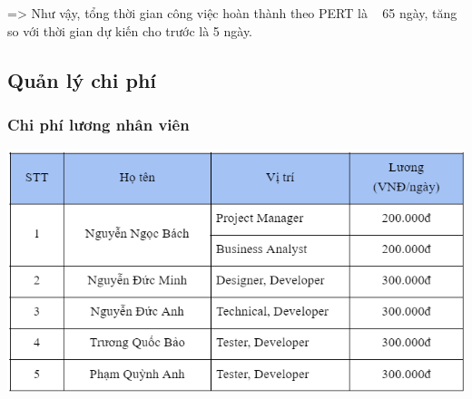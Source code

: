 \documentclass[12pt]{article}
\begin{document}
=> Như vậy, tổng thời gian công việc hoàn thành theo PERT là ~ 65 ngày, tăng so với thời gian dự kiến cho trước là 5 ngày.

\subsection{Quản lý chi phí}
\subsubsection{Chi phí lương nhân viên}
\includegraphics[width=15cm]{Luong0.png}
\vspace{0.5cm}
\end{document}
